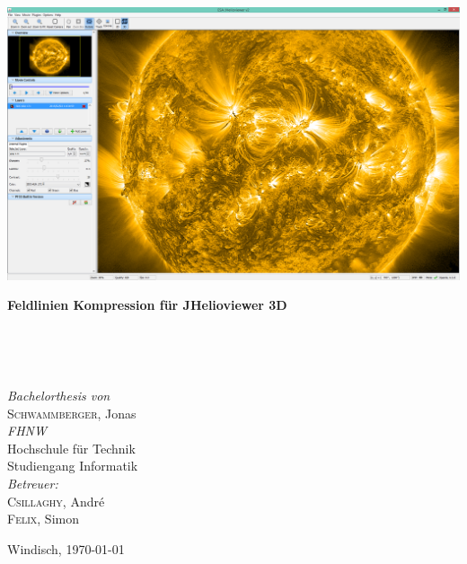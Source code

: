
\thispagestyle{titlestyle}

\includegraphics[width=1\textwidth]{./pictures/title2.png}\\

\begin{onehalfspace}
\begin{huge}
\textbf{Feldlinien Kompression für JHelioviewer 3D}
\end{huge}
\vspace{0.1cm}\\
\begin{Large}
\end{Large}
\vspace{0.8cm}\\
\begin{large}
\emph{Bachelorthesis von}\\
\textsc{Schwammberger}, Jonas\vspace{0.8cm}\\
\emph{FHNW}\\
Hochschule für Technik\\
Studiengang Informatik\vspace{0.8cm}\\
\emph{Betreuer:}\\
\textsc{Csillaghy}, André\\
\textsc{Felix}, Simon\vspace{0.8cm}\\
\end{large}
\end{onehalfspace}
\vfill
\begin{normalsize}
Windisch, \today
\end{normalsize}
\pagebreak
